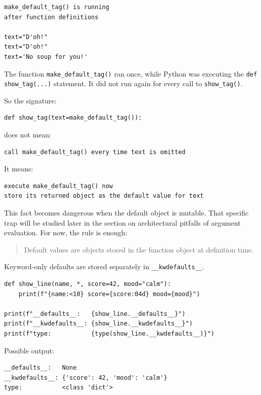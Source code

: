 \begin{verbatim}
make_default_tag() is running
after function definitions

text="D'oh!"
text="D'oh!"
text='No soup for you!'
\end{verbatim}

The function \texttt{make\_default\_tag()} ran once, while Python was executing the \texttt{def show\_tag(...)} statement. It did not run again for every call to \texttt{show\_tag()}.

So the signature:

\begin{verbatim}
def show_tag(text=make_default_tag()):
\end{verbatim}

does not mean:

\begin{verbatim}
call make_default_tag() every time text is omitted
\end{verbatim}

It means:

\begin{verbatim}
execute make_default_tag() now
store its returned object as the default value for text
\end{verbatim}

This fact becomes dangerous when the default object is mutable. That specific trap will be studied later in the section on architectural pitfalls of argument evaluation. For now, the rule is enough:

\begin{quote}
Default values are objects stored in the function object at definition time.
\end{quote}

Keyword-only defaults are stored separately in \texttt{\_\_kwdefaults\_\_}.

\begin{verbatim}
def show_line(name, *, score=42, mood="calm"):
    print(f"{name:<10} score={score:04d} mood={mood}")

print(f"__defaults__:   {show_line.__defaults__}")
print(f"__kwdefaults__: {show_line.__kwdefaults__}")
print(f"type:           {type(show_line.__kwdefaults__)}")
\end{verbatim}

Possible output:

\begin{verbatim}
__defaults__:   None
__kwdefaults__: {'score': 42, 'mood': 'calm'}
type:           <class 'dict'>
\end{verbatim}

